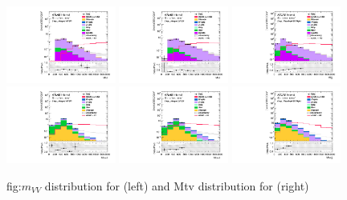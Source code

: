 \begin{figure}[ht]
    \centering
    	\includegraphics[width=0.32\textwidth]{figures/aQGC/MVV/Region_distMllJ_DSRVBSHP_BMin0_J0_incJet1_L2_T0_incFat1_Y6051_incTag1_Fat1_Prefitlog.pdf}
    \includegraphics[width=0.32\textwidth]{figures/aQGC/MVV/Region_distMllJ_DSRVBSLP_BMin0_J0_incJet1_L2_T0_incFat1_Y6051_incTag1_Fat1_Prefitlog.pdf}
  \includegraphics[width=0.32\textwidth]{figures/aQGC/MVV/Region_distMlljj_DSRVBSFid_BMin0_T0_Y6051_incTag1_J2_L2_incJet1_Prefitlog.pdf}
    	\includegraphics[width=0.32\textwidth]{figures/aQGC/MVV/Region_distMtvvJ_DSRVBSHP_BMin0_J0_incJet1_L0_T0_incFat1_Y6051_incTag1_Fat1_Prefitlog.pdf}
    \includegraphics[width=0.32\textwidth]{figures/aQGC/MVV/Region_distMtvvJ_DSRVBSLP_BMin0_J0_incJet1_L0_T0_incFat1_Y6051_incTag1_Fat1_Prefitlog.pdf}
 \includegraphics[width=0.32\textwidth]{figures/aQGC/MVV/Region_distMtvvjj_DSRVBSFid_BMin0_T0_Y6051_incTag1_J2_L0_incJet1_Prefitlog.pdf}
        \caption{fig:$m_{VV}$ distribution for \tlep (left) and Mtv distribution for \zlep (right)}
        \label{fig:mVVdist}
\end{figure}

